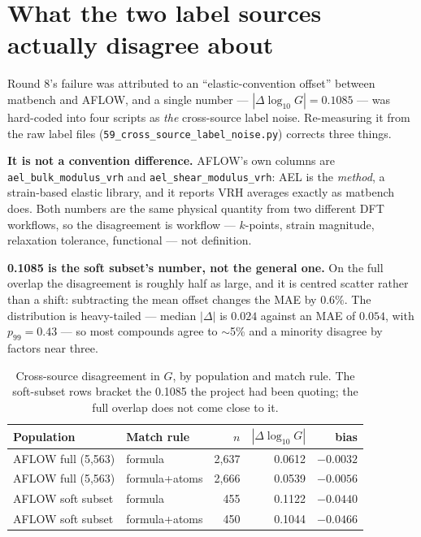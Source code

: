 \documentclass[11pt,a4paper]{article}
\begin{document}
\section{What the two label sources actually disagree about}

Round 8's failure was attributed to an ``elastic-convention offset'' between
matbench and AFLOW, and a single number --- $|\Delta \log_{10} G| = 0.1085$ ---
was hard-coded into four scripts as \emph{the} cross-source label noise.
Re-measuring it from the raw label files
(\texttt{59\_cross\_source\_\allowbreak{}label\_noise.py}) corrects three
things.

\textbf{It is not a convention difference.} AFLOW's own columns are
\texttt{ael\_bulk\_modulus\_vrh} and \texttt{ael\_shear\_modulus\_vrh}: AEL is
the \emph{method}, a strain-based elastic library, and it reports VRH averages
exactly as matbench does. Both numbers are the same physical quantity from two
different DFT workflows, so the disagreement is workflow --- $k$-points, strain
magnitude, relaxation tolerance, functional --- not definition.

\textbf{0.1085 is the soft subset's number, not the general one.} On the full
overlap the disagreement is roughly half as large, and it is centred scatter
rather than a shift: subtracting the mean offset changes the MAE by $0.6\%$.
The distribution is heavy-tailed --- median $|\Delta|$ is $0.024$ against an
MAE of $0.054$, with $p_{99} = 0.43$ --- so most compounds agree to $\sim$5\%
and a minority disagree by factors near three.

\begin{table}[h]
\centering
\footnotesize
\caption{Cross-source disagreement in $G$, by population and match rule. The
soft-subset rows bracket the 0.1085 the project had been quoting; the full
overlap does not come close to it.}
\begin{tabular}{@{}llrrr@{}}
\toprule
Population & Match rule & $n$ & $|\Delta \log_{10} G|$ & bias \\
\midrule
AFLOW full (5{,}563) & formula        & 2{,}637 & 0.0612 & $-0.0032$ \\
AFLOW full (5{,}563) & formula+atoms  & 2{,}666 & 0.0539 & $-0.0056$ \\
AFLOW soft subset    & formula        &    455  & 0.1122 & $-0.0440$ \\
AFLOW soft subset    & formula+atoms  &    450  & 0.1044 & $-0.0466$ \\
\bottomrule
\end{tabular}
\end{table}
\end{document}
